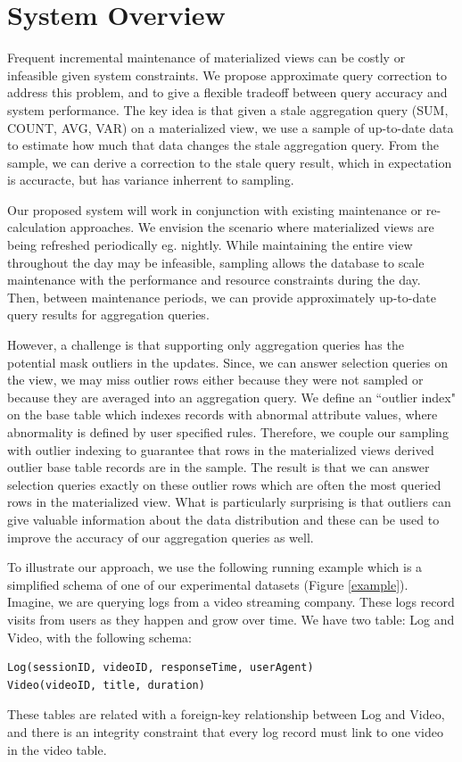 \section{System Overview}
Frequent incremental maintenance of materialized views can be costly or infeasible given system constraints. 
We propose approximate query correction to address this problem, and to give a flexible tradeoff between query accuracy and system performance.
The key idea is that given a stale aggregation query (SUM, COUNT, AVG, VAR) on a materialized view, we use a sample of up-to-date data to estimate how much that data changes the stale aggregation query.
From the sample, we can derive a correction to the stale query result, which in expectation is accuracte, but has variance inherrent to sampling.

Our proposed system will work in conjunction with existing maintenance or re-calculation approaches.
We envision the scenario where materialized views are being refreshed periodically eg. nightly.
While maintaining the entire view throughout the day may be infeasible, sampling allows the database to scale maintenance with the performance and resource constraints during the day.
Then, between maintenance periods, we can provide approximately up-to-date query results for aggregation queries.

However, a challenge is that supporting only aggregation queries has the potential mask outliers in the updates.
Since, we can answer selection queries on the view, we may miss outlier rows either because they were not sampled or because
they are averaged into an aggregation query.
We define an ``outlier index" on the base table which indexes records with abnormal attribute values, where abnormality is defined by user specified rules.
Therefore, we couple our sampling with outlier indexing to guarantee that rows in the materialized views derived outlier base table records are in the sample.
The result is that we can answer selection queries exactly on these outlier rows which are often the most queried rows in the materialized view.
What is particularly surprising is that outliers can give valuable information about the data distribution and these can be used to improve the accuracy of our aggregation queries as well.

To illustrate our approach, we use the following running example which is a 
simplified schema of one of our experimental datasets (Figure \ref{example}).
Imagine, we are querying logs from a video streaming company. 
These logs record visits from users as they happen and grow over time.
We have two table: Log and Video, with the following schema:
\begin{lstlisting}
Log(sessionID, videoID, responseTime, userAgent)
Video(videoID, title, duration)
\end{lstlisting}
These tables are related with a foreign-key relationship between
Log and Video, and there is an integrity constraint that every log
record must link to one video in the video table.

